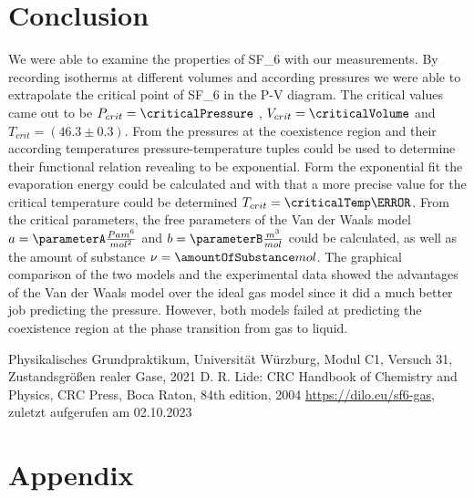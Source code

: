 \documentclass[a4paper,10pt,twocolumn]{article}
\begin{document}
    \section[]{Conclusion}\label{sec:conclusion}
    We were able to examine the properties of SF_6\) with our measurements.
    By recording isotherms at different volumes and according pressures we were able to extrapolate the critical point of SF_6\) in the P-V diagram.
    The critical values came out to be $P_{crit}=\criticalPressure$ , $V_{crit}=\criticalVolume$ and $T_{crit}=(46.3\pm 0.3)$.
    From the pressures at the coexistence region and their according temperatures pressure-temperature tuples could be used to determine their functional
    relation revealing to be exponential.
    Form the exponential fit the evaporation energy could be calculated and with that a more precise value for the critical temperature could be determined
    $T_{crit}=\criticalTemp \degree$.
    From the critical parameters, the free parameters of the Van der Waals model $a=\parameterA \frac{Pa m^6}{mol^2} $ and $b=\parameterB \frac{m^3}{mol} $ could be calculated, as well as the amount of substance
    $\nu = \amountOfSubstance mol$.
    The graphical comparison of the two models and the experimental data showed the advantages of the Van der Waals model over the ideal gas model since it did a much better job predicting
    the pressure.
    However, both models failed at predicting the coexistence region at the phase transition from gas to liquid.
    \begin{thebibliography}{}    %
         Physikalisches Grundpraktikum, Universität Würzburg, Modul C1, Versuch 31, Zustandsgrößen realer Gase, 2021
         D. R. Lide: \grqq CRC Handbook of Chemistry
        and Physics\grqq , CRC Press, Boca Raton, 84th
        edition, 2004
         \url{https://dilo.eu/sf6-gas}, zuletzt aufgerufen am 02.10.2023
    \end{thebibliography}
    \newpage
    \section[]{Appendix}\label{sec:apendix}
\end{document}
